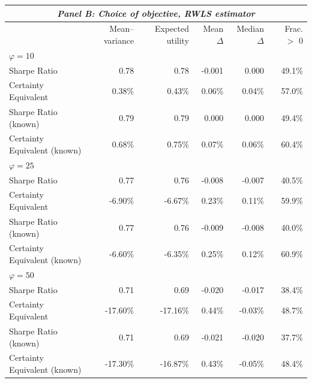 \begin{tabular*}{\textwidth}{l@{\extracolsep{\fill}}rrrrr}
\multicolumn{6}{c}{\textit{Panel B: Choice of objective, RWLS estimator}} \\
\midrule
 & Mean--variance & Expected utility & Mean $\Delta$ & Median $\Delta$ & Frac. $>$ 0 \\
\midrule
\multicolumn{6}{l}{\textit{$\varphi = 10$}} \\
\midrule
Sharpe Ratio & 0.78 & 0.78 & -0.001 & 0.000 & 49.1\% \\
Certainty Equivalent & 0.38\% & 0.43\% & 0.06\% & 0.04\% & 57.0\% \\
Sharpe Ratio (known) & 0.79 & 0.79 & 0.000 & 0.000 & 49.4\% \\
Certainty Equivalent (known) & 0.68\% & 0.75\% & 0.07\% & 0.06\% & 60.4\% \\
\midrule
\multicolumn{6}{l}{\textit{$\varphi = 25$}} \\
\midrule
Sharpe Ratio & 0.77 & 0.76 & -0.008 & -0.007 & 40.5\% \\
Certainty Equivalent & -6.90\% & -6.67\% & 0.23\% & 0.11\% & 59.9\% \\
Sharpe Ratio (known) & 0.77 & 0.76 & -0.009 & -0.008 & 40.0\% \\
Certainty Equivalent (known) & -6.60\% & -6.35\% & 0.25\% & 0.12\% & 60.9\% \\
\midrule
\multicolumn{6}{l}{\textit{$\varphi = 50$}} \\
\midrule
Sharpe Ratio & 0.71 & 0.69 & -0.020 & -0.017 & 38.4\% \\
Certainty Equivalent & -17.60\% & -17.16\% & 0.44\% & -0.03\% & 48.7\% \\
Sharpe Ratio (known) & 0.71 & 0.69 & -0.021 & -0.020 & 37.7\% \\
Certainty Equivalent (known) & -17.30\% & -16.87\% & 0.43\% & -0.05\% & 48.4\% \\
\bottomrule
\end{tabular*}

